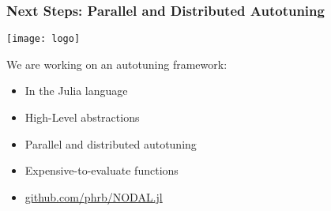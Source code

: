 \documentclass[10pt, compress, aspectratio=169, xcolor=table]{beamer}
\begin{document}
\begin{frame}
    \frametitle{Next Steps: Parallel and Distributed Autotuning}
    \begin{center}
        \texttt{[image: logo]}
    \end{center}

    We are working on an autotuning framework:
    \begin{itemize}
        \item In the \alert{Julia} language
        \item High-Level abstractions
        \item \alert{Parallel and distributed autotuning}
        \item \alert{Expensive-to-evaluate functions}
        \item \url{github.com/phrb/NODAL.jl}
    \end{itemize}
\end{frame}

\maketitle
\end{document}
